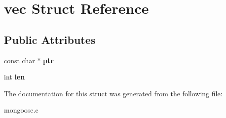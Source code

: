 \hypertarget{structvec}{\section{vec Struct Reference}
\label{structvec}
}
\subsection*{Public Attributes}
\begin{DoxyCompactItemize}
\item 
\hypertarget{structvec_ae8b8fdc00d1598d046d14d0ae73a441a}{const char $\ast$ {\bfseries ptr}}\label{structvec_ae8b8fdc00d1598d046d14d0ae73a441a}

\item 
\hypertarget{structvec_af52266b373688d591406b7d465ad019c}{int {\bfseries len}}\label{structvec_af52266b373688d591406b7d465ad019c}

\end{DoxyCompactItemize}


The documentation for this struct was generated from the following file\-:\begin{DoxyCompactItemize}
\item 
mongoose.\-c\end{DoxyCompactItemize}

